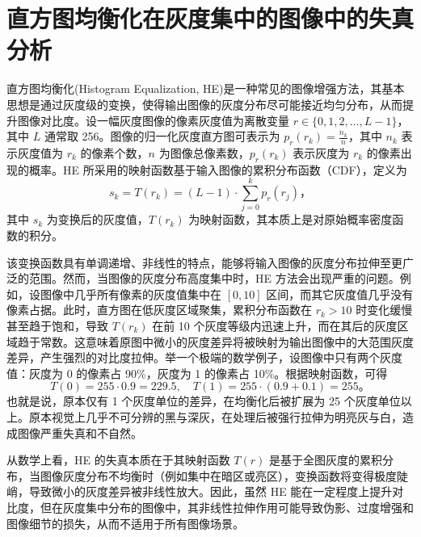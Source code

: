 \documentclass{ctexart}
\begin{document}
\section{直方图均衡化在灰度集中的图像中的失真分析}

直方图均衡化(Histogram Equalization, HE)是一种常见的图像增强方法，其基本思想是通过灰度级的变换，使得输出图像的灰度分布尽可能接近均匀分布，从而提升图像对比度。设一幅灰度图像的像素灰度值为离散变量 $r \in \{0, 1, 2, \dots, L-1\}$，其中 $L$ 通常取 256。图像的归一化灰度直方图可表示为 $p_r(r_k) = \frac{n_k}{n}$，其中 $n_k$ 表示灰度值为 $r_k$ 的像素个数，$n$ 为图像总像素数，$p_r(r_k)$ 表示灰度为 $r_k$ 的像素出现的概率。HE 所采用的映射函数基于输入图像的累积分布函数（CDF），定义为
\[
s_k = T(r_k) = (L - 1) \cdot \sum_{j=0}^{k} p_r(r_j)，
\]
其中 $s_k$ 为变换后的灰度值，$T(r_k)$ 为映射函数，其本质上是对原始概率密度函数的积分。

该变换函数具有单调递增、非线性的特点，能够将输入图像的灰度分布拉伸至更广泛的范围。然而，当图像的灰度分布高度集中时，HE 方法会出现严重的问题。例如，设图像中几乎所有像素的灰度值集中在 $[0,10]$ 区间，而其它灰度值几乎没有像素占据。此时，直方图在低灰度区域聚集，累积分布函数在 $r_k > 10$ 时变化缓慢甚至趋于饱和，导致 $T(r_k)$ 在前 10 个灰度等级内迅速上升，而在其后的灰度区域趋于常数。这意味着原图中微小的灰度差异将被映射为输出图像中的大范围灰度差异，产生强烈的对比度拉伸。举一个极端的数学例子，设图像中只有两个灰度值：灰度为 0 的像素占 90\%，灰度为 1 的像素占 10\%。根据映射函数，可得
\[
T(0) = 255 \cdot 0.9 = 229.5, \quad T(1) = 255 \cdot (0.9 + 0.1) = 255。
\]
也就是说，原本仅有 1 个灰度单位的差异，在均衡化后被扩展为 25 个灰度单位以上。原本视觉上几乎不可分辨的黑与深灰，在处理后被强行拉伸为明亮灰与白，造成图像严重失真和不自然。

从数学上看，HE 的失真本质在于其映射函数 $T(r)$ 是基于全图灰度的累积分布，当图像灰度分布不均衡时（例如集中在暗区或亮区），变换函数将变得极度陡峭，导致微小的灰度差异被非线性放大。因此，虽然 HE 能在一定程度上提升对比度，但在灰度集中分布的图像中，其非线性拉伸作用可能导致伪影、过度增强和图像细节的损失，从而不适用于所有图像场景。
   \newpage
\end{document}
